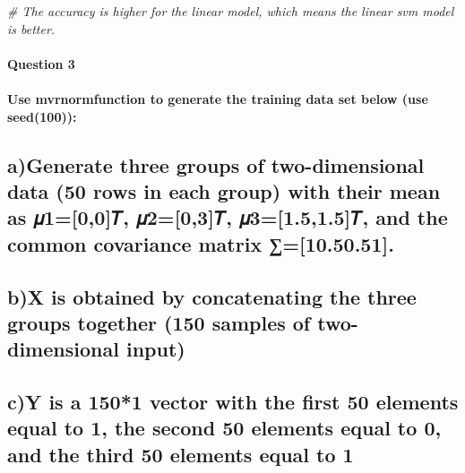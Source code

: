 \documentclass[
]{article}
\newenvironment{Shaded}{\begin{snugshade}}{\end{snugshade}}
\newcommand{\CommentTok}[1]{\textcolor[rgb]{0.56,0.35,0.01}{\textit{#1}}}
\begin{document}
\begin{Shaded}
\begin{Highlighting}[]
\CommentTok{\# The accuracy is higher for the linear model, which means the linear svm model is better.  }
\end{Highlighting}
\end{Shaded}

\hypertarget{question-3}{%
\paragraph{Question 3}\label{question-3}}

\hypertarget{use-mvrnormfunction-to-generate-the-training-data-set-below-use-seed100}{%
\paragraph{Use mvrnormfunction to generate the training data set below
(use
seed(100)):}\label{use-mvrnormfunction-to-generate-the-training-data-set-below-use-seed100}}

\hypertarget{agenerate-three-groups-of-two-dimensional-data-50-rows-in-each-group-with-their-mean-as-ux1d707100ux1d447-ux1d707203ux1d447-ux1d70731.51.5ux1d447-and-the-common-covariance-matrix-10.50.51.}{%
\subsection{a)Generate three groups of two-dimensional data (50 rows in
each group) with their mean as 𝜇1={[}0,0{]}𝑇, 𝜇2={[}0,3{]}𝑇,
𝜇3={[}1.5,1.5{]}𝑇, and the common covariance matrix
∑={[}10.50.51{]}.}\label{agenerate-three-groups-of-two-dimensional-data-50-rows-in-each-group-with-their-mean-as-ux1d707100ux1d447-ux1d707203ux1d447-ux1d70731.51.5ux1d447-and-the-common-covariance-matrix-10.50.51.}}

\hypertarget{bx-is-obtained-by-concatenating-the-three-groups-together-150-samples-of-two-dimensional-input}{%
\subsection{b)X is obtained by concatenating the three groups together
(150 samples of two-dimensional
input)}\label{bx-is-obtained-by-concatenating-the-three-groups-together-150-samples-of-two-dimensional-input}}

\hypertarget{cy-is-a-1501-vector-with-the-first-50-elements-equal-to-1-the-second-50-elements-equal-to-0-and-the-third-50-elements-equal-to-1}{%
\subsection{c)Y is a 150*1 vector with the first 50 elements equal to 1,
the second 50 elements equal to 0, and the third 50 elements equal to
1}\label{cy-is-a-1501-vector-with-the-first-50-elements-equal-to-1-the-second-50-elements-equal-to-0-and-the-third-50-elements-equal-to-1}}
\end{document}
